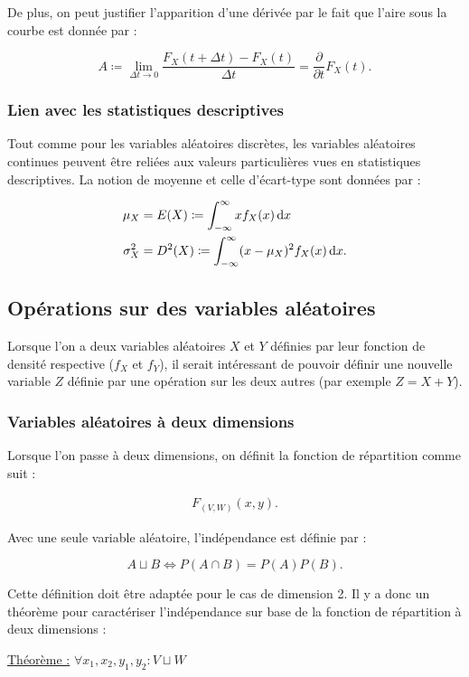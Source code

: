 \documentclass{article}
\renewcommand{\pd}[1]{\frac {\partial}{\partial #1}}
\begin{document}
			De plus, on peut justifier l'apparition d'une dérivée par le fait que l'aire sous la courbe est donnée par :

			\[A \coloneqq \lim_{\Delta t \to 0}\frac {F_X(t + \Delta t) - F_X(t)}{\Delta t} = \pd{t}F_X(t).\]

		\subsubsection{Lien avec les statistiques descriptives}
			Tout comme pour les variables aléatoires discrètes, les variables aléatoires continues peuvent être reliées aux valeurs particulières vues en statistiques
			descriptives. La notion de moyenne et celle d'écart-type sont données par :

			\begin{align}
				\mu_X &= E(X) \coloneqq \int_{-\infty}^\infty x f_X(x)\dif x \\
				\sigma_X^2 &= D^2(X) \coloneqq \int_{-\infty}^\infty(x-\mu_X)^2f_X(x)\dif x.
			\end{align}
	\subsection{Opérations sur des variables aléatoires}
		Lorsque l'on a deux variables aléatoires $X$ et $Y$ définies par leur fonction de densité respective ($f_X$ et $f_Y$), il serait intéressant de pouvoir définir une
		nouvelle variable $Z$ définie par une opération sur les deux autres (par exemple $Z = X+Y$).
		
		\subsubsection{Variables aléatoires à deux dimensions}
			Lorsque l'on passe à deux dimensions, on définit la fonction de répartition comme suit :

			\begin{align}
				F_{(V, W)}(x, y).
			\end{align}

			Avec une seule variable aléatoire, l'indépendance est définie par :

			\[A \sqcup B \iff P(A \cap B) = P(A)P(B).\]

			Cette définition doit être adaptée pour le cas de dimension 2. Il y a donc un théorème pour caractériser l'indépendance sur base de la fonction de répartition à deux
			dimensions :

			\underline{Théorème :} $\forall x_1, x_2, y_1, y_2 : V \sqcup W$
\end{document}
